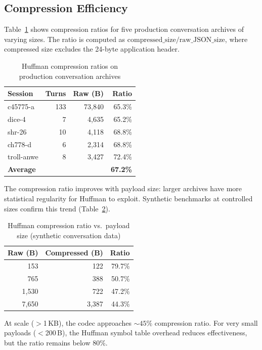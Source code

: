 \documentclass[conference]{IEEEtran}
\begin{document}
\subsection{Compression Efficiency}

Table~\ref{tab:compression} shows compression ratios for five production conversation archives of varying sizes. The ratio is computed as $\text{compressed\_size} / \text{raw\_JSON\_size}$, where compressed size excludes the 24-byte application header.

\begin{table}[h]
\centering
\caption{Huffman compression ratios on production conversation archives}
\label{tab:compression}
\begin{tabular}{lrrr}
\toprule
\textbf{Session} & \textbf{Turns} & \textbf{Raw (B)} & \textbf{Ratio} \\
\midrule
c45775-a & 133 & 73{,}840 & 65.3\% \\
dice-4 & 7 & 4{,}635 & 65.2\% \\
shr-26 & 10 & 4{,}118 & 68.8\% \\
ch778-d & 6 & 2{,}314 & 68.8\% \\
troll-anwe & 8 & 3{,}427 & 72.4\% \\
\midrule
\textbf{Average} & & & \textbf{67.2\%} \\
\bottomrule
\end{tabular}
\end{table}

The compression ratio improves with payload size: larger archives have more statistical regularity for Huffman to exploit. Synthetic benchmarks at controlled sizes confirm this trend (Table~\ref{tab:compression_scaling}).

\begin{table}[h]
\centering
\caption{Huffman compression ratio vs.\ payload size (synthetic conversation data)}
\label{tab:compression_scaling}
\begin{tabular}{rrr}
\toprule
\textbf{Raw (B)} & \textbf{Compressed (B)} & \textbf{Ratio} \\
\midrule
153 & 122 & 79.7\% \\
765 & 388 & 50.7\% \\
1{,}530 & 722 & 47.2\% \\
7{,}650 & 3{,}387 & 44.3\% \\
\bottomrule
\end{tabular}
\end{table}

At scale ($>$1\,KB), the codec approaches ${\sim}45\%$ compression ratio. For very small payloads ($<$200\,B), the Huffman symbol table overhead reduces effectiveness, but the ratio remains below 80\%.
\end{document}
